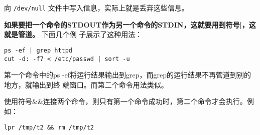 \documentclass[11pt]{article}
\begin{document}
向 \texttt{/dev/null} 文件中写入信息，实际上就是丢弃这些信息。

\textbf{如果要把一个命令的STDOUT作为另一个命令的STDIN，这就要用到符号|，这就是管道。} 下面几个例
 子展示了这种用法：

\begin{verbatim}
ps -ef | grep httpd
cut -d: -f7 < /etc/passwd | sort -u
\end{verbatim}

第一个命令中的ps -ef将运行结果输出到grep，而grep的运行结果不再管道到别的地方，就输出到终
端窗口。而第二个命令用法类似。

使用符号\&\&连接两个命令，则只有第一个命令成功时，第二个命令才会执行。例如：

\begin{verbatim}
lpr /tmp/t2 && rm /tmp/t2
\end{verbatim}
\end{document}

